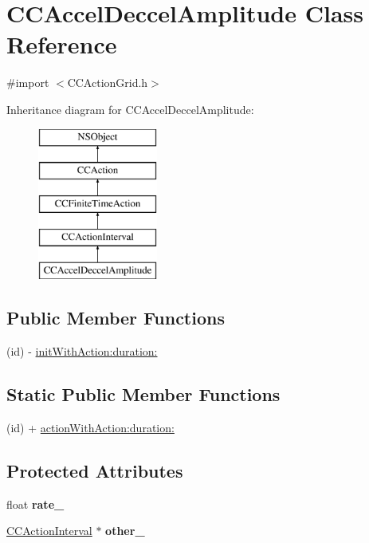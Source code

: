 \hypertarget{interface_c_c_accel_deccel_amplitude}{\section{C\-C\-Accel\-Deccel\-Amplitude Class Reference}
\label{interface_c_c_accel_deccel_amplitude}
}


{\ttfamily \#import $<$C\-C\-Action\-Grid.\-h$>$}

Inheritance diagram for C\-C\-Accel\-Deccel\-Amplitude\-:\begin{figure}[H]
\begin{center}
\leavevmode
\includegraphics[height=5.000000cm]{interface_c_c_accel_deccel_amplitude}
\end{center}
\end{figure}
\subsection*{Public Member Functions}
\begin{DoxyCompactItemize}
\item 
(id) -\/ \hyperlink{interface_c_c_accel_deccel_amplitude_a90e669f2d22bb8efbdbcb09629b39ff7}{init\-With\-Action\-:duration\-:}
\end{DoxyCompactItemize}
\subsection*{Static Public Member Functions}
\begin{DoxyCompactItemize}
\item 
(id) + \hyperlink{interface_c_c_accel_deccel_amplitude_a8fa189381cf3149fd782109aaf1336b3}{action\-With\-Action\-:duration\-:}
\end{DoxyCompactItemize}
\subsection*{Protected Attributes}
\begin{DoxyCompactItemize}
\item 
\hypertarget{interface_c_c_accel_deccel_amplitude_a1d368d66a6c7f995230e741552083ed4}{float {\bfseries rate\-\_\-}}\label{interface_c_c_accel_deccel_amplitude_a1d368d66a6c7f995230e741552083ed4}

\item 
\hypertarget{interface_c_c_accel_deccel_amplitude_af7bd2c02fbc3fdff68fa1d43a3cb1cd8}{\hyperlink{class_c_c_action_interval}{C\-C\-Action\-Interval} $\ast$ {\bfseries other\-\_\-}}\label{interface_c_c_accel_deccel_amplitude_af7bd2c02fbc3fdff68fa1d43a3cb1cd8}

\end{DoxyCompactItemize}

